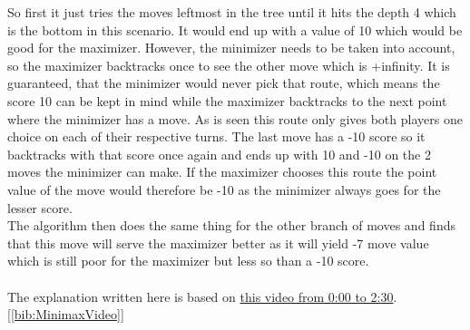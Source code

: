 So first it just tries the moves leftmost in the tree until it hits the depth 4 which is the bottom in this scenario. It would end up with a value of 10 which would be good for the maximizer. 
However, the minimizer needs to be taken into account, so the maximizer backtracks once to see the other move which is +infinity. 
It is guaranteed, that the minimizer would never pick that route, which means the score 10 can be kept in mind while the maximizer backtracks to the next point where the minimizer has a move. 
As is seen this route only gives both players one choice on each of their respective turns. 
The last move has a -10 score so it backtracks with that score once again and ends up with 10 and -10 on the 2 moves the minimizer can make. 
If the maximizer chooses this route the point value of the move would therefore be -10 as the minimizer always goes for the lesser score.\\
The algorithm then does the same thing for the other branch of moves and finds that this move will serve the maximizer better as it will yield -7 move value which is still poor for the maximizer but less so than a -10 score.\\\\
The explanation written here is based on \href{https://www.youtube.com/watch?v=l-hh51ncgDI}{this video from 0:00 to 2:30}.[\ref{bib:MinimaxVideo}]
\clearpage
